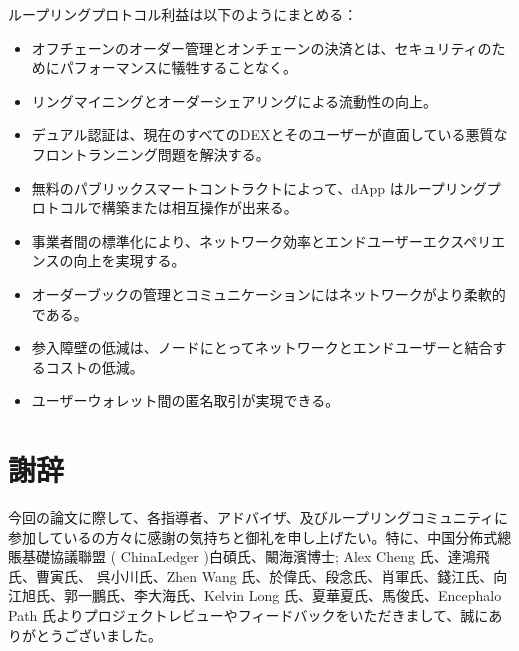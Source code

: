 \documentclass{article}
\makeatletter
\newenvironment{figurehere}
 {\def\@captype{figure}}
 {}
\makeatother
\begin{document}
\begin{multicols}{2}
ループリングプロトコル利益は以下のようにまとめる：
\begin{itemize}
	\item オフチェーンのオーダー管理とオンチェーンの決済とは、セキュリティのためにパフォーマンスに犠牲することなく。
	\item リングマイニングとオーダーシェアリングによる流動性の向上。
	\item デュアル認証は、現在のすべてのDEXとそのユーザーが直面している悪質なフロントランニング問題を解決する。
	\item 無料のパブリックスマートコントラクトによって、dApp はループリングプロトコルで構築または相互操作が出来る。
	\item 事業者間の標準化により、ネットワーク効率とエンドユーザーエクスペリエンスの向上を実現する。
	\item オーダーブックの管理とコミュニケーションにはネットワークがより柔軟的である。
	\item 参入障壁の低減は、ノードにとってネットワークとエンドユーザーと結合するコストの低減。
	\item ユーザーウォレット間の匿名取引が実現できる。
\end{itemize}

\section{謝辞}
今回の論文に際して、各指導者、アドバイザ、及びループリングコミュニティに参加しているの方々に感謝の気持ちと御礼を申し上げたい。特に、中国分佈式總賬基礎協議聯盟 ( ChinaLedger )白碩氏、闞海濱博士; Alex Cheng 氏、達鴻飛氏、曹寅氏、 呉小川氏、Zhen Wang 氏、於偉氏、段念氏、肖軍氏、錢江氏、向江旭氏、郭一鵬氏、李大海氏、Kelvin Long 氏、夏華夏氏、馬俊氏、Encephalo Path 氏よりプロジェクトレビューやフィードバックをいただきまして、誠にありがとうございました。


\end{multicols}
%
%
\end{document}
